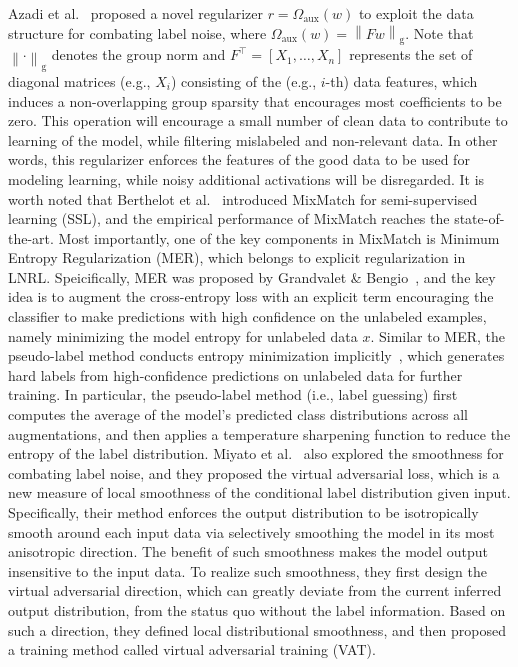\label{exp-reg}
Azadi et al.~ proposed a novel regularizer $r = \Omega_{\text{aux}}(w)$ to exploit the data structure for combating label noise, 
where $\Omega_{\text{aux}}(w) = \left\lVert Fw\right\rVert_\mathrm{g}$. 
Note that $\left\lVert \cdot \right\rVert_\mathrm{g}$ denotes the group norm 
and $F^{\top} = [X_1,\ldots,X_n]$ represents the set of diagonal matrices (e.g., $X_i$) consisting of the (e.g., $i$-th) data features,
which induces a non-overlapping group sparsity
that encourages  most coefficients to be zero. 
This operation will encourage a small number of clean data to contribute to learning of the model, while filtering mislabeled and non-relevant data. 
In other words, this regularizer enforces the features of the good data to be used for modeling learning, while noisy additional activations will be disregarded. 
It is worth noted that Berthelot et al.~ introduced MixMatch for semi-supervised learning (SSL), and the empirical performance of MixMatch reaches the state-of-the-art. Most importantly, one of the key components in MixMatch is Minimum Entropy Regularization (MER), which belongs to explicit regularization in LNRL. Speicifically, MER was proposed by Grandvalet \& Bengio~, and the key idea is to augment the cross-entropy loss with an explicit term encouraging the classifier to make predictions with high confidence on the unlabeled examples, namely minimizing the model entropy  
for unlabeled data $x$. Similar to MER, the pseudo-label method conducts entropy minimization implicitly~, which generates hard labels from high-confidence predictions on unlabeled data for further training. In particular, the pseudo-label method (i.e., label guessing) first computes the average of the model’s predicted class distributions across all augmentations, and then applies a temperature sharpening function to reduce the entropy of the label distribution.
Miyato et al.~ also explored the smoothness for combating label noise, and they proposed the virtual adversarial loss, which is a new measure of local smoothness of the conditional label distribution given input. Specifically, their method enforces the output distribution to be isotropically smooth around each input data 
via selectively smoothing the model in its most anisotropic direction. The
benefit of such smoothness makes the model output insensitive  to the input data. To realize such smoothness, they first design the virtual adversarial direction, which can greatly deviate from the current inferred output distribution, from the status quo without the label information. Based on such a direction, they defined local distributional smoothness, and then proposed a training method called virtual adversarial training (VAT).
